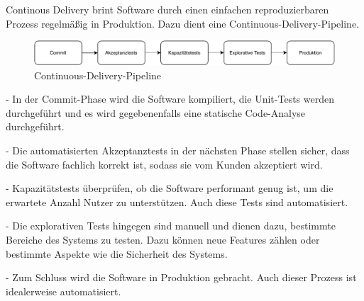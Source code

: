 Continous Delivery brint Software durch einen einfachen reproduzierbaren Prozess regelmäßig in Produktion. Dazu dient eine Continuous-Delivery-Pipeline.

\begin{figure}[bth]
    \centering
    \includegraphics[width=1.0\textwidth]{Chapters/Bilder/CDP.pdf}
    \caption{Continuous-Delivery-Pipeline}
   \label{fig:cdp}
  \end{figure}
\newpage
\begin{description}
	\item - In der Commit-Phase wird die Software kompiliert, die Unit-Tests werden durchgeführt und es wird gegebenenfalls eine statische Code-Analyse durchgeführt.
	\item - Die automatisierten Akzeptanztests in der nächsten Phase stellen sicher, dass die Software fachlich korrekt ist, sodass sie vom Kunden akzeptiert wird.
	\item - Kapazitätstests überprüfen, ob die Software performant genug ist, um die erwartete Anzahl Nutzer zu unterstützen. Auch diese Tests sind automatisiert.
	\item - Die explorativen Tests hingegen sind manuell und dienen dazu, bestimmte Bereiche des Systems zu testen. Dazu können neue Features zählen oder bestimmte Aspekte wie die Sicherheit des Systems.
	\item - Zum Schluss wird die Software in Produktion gebracht. Auch dieser Prozess ist idealerweise automatisiert.
\end{description}

